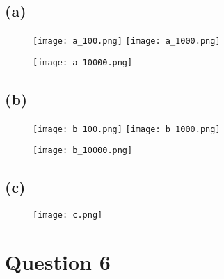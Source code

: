 \documentclass[11pt, fleqn]{article}
\begin{document}
\subsection*{(a)}
\begin{figure}[H]
    \centering
    \begin{floatrow}
        \ffigbox[0.4\textwidth]{}
        {\texttt{[image: a\_100.png]}}
        \ffigbox[0.4\textwidth]{}
        {\texttt{[image: a\_1000.png]}}
    \end{floatrow}
    \vspace{1em}
    \begin{floatrow}
        \ffigbox[0.4\textwidth]{}
        {\texttt{[image: a\_10000.png]}}
    \end{floatrow}
\end{figure}

\subsection*{(b)}
\begin{figure}[H]
    \centering
    \begin{floatrow}
        \ffigbox[0.4\textwidth]{}
        {\texttt{[image: b\_100.png]}}
        \ffigbox[0.4\textwidth]{}
        {\texttt{[image: b\_1000.png]}}
    \end{floatrow}
    \vspace{1em}
    \begin{floatrow}
        \ffigbox[0.4\textwidth]{}
        {\texttt{[image: b\_10000.png]}}
    \end{floatrow}
\end{figure}

\subsection*{(c)}
\begin{figure}[H]
    \centering
    \texttt{[image: c.png]}
\end{figure}



\newpage
\section*{Question 6}
\setcounter{equation}{0}
\end{document}
